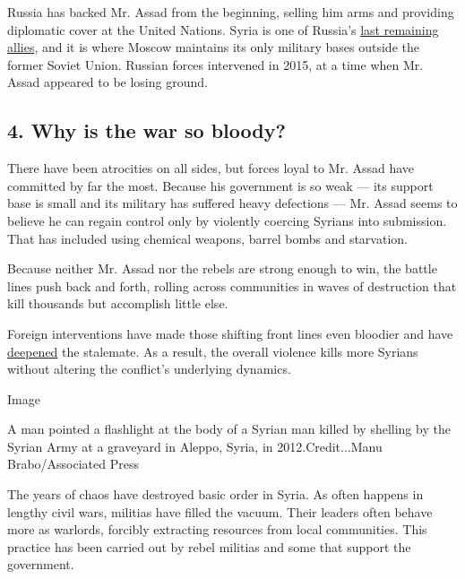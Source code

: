 Russia has backed Mr. Assad from the beginning, selling him arms and
providing diplomatic cover at the United Nations. Syria is one of
Russia's
\href{http://www.nytimes3xbfgragh.onion/2012/07/11/world/middleeast/russia-sends-warships-on-maneuvers-near-syria.html}{last
remaining allies}, and it is where Moscow maintains its only military
bases outside the former Soviet Union. Russian forces intervened in
2015, at a time when Mr. Assad appeared to be losing ground.

\hypertarget{4-why-is-the-war-so-bloody}{%
\subsection{\texorpdfstring{\textbf{4. Why is the war so
bloody?}}{4. Why is the war so bloody?}}\label{4-why-is-the-war-so-bloody}}

There have been atrocities on all sides, but forces loyal to Mr. Assad
have committed by far the most. Because his government is so weak ---
its support base is small and its military has suffered heavy defections
--- Mr. Assad seems to believe he can regain control only by violently
coercing Syrians into submission. That has included using chemical
weapons, barrel bombs and starvation.

Because neither Mr. Assad nor the rebels are strong enough to win, the
battle lines push back and forth, rolling across communities in waves of
destruction that kill thousands but accomplish little else.

Foreign interventions have made those shifting front lines even bloodier
and have
\href{http://www.nytimes3xbfgragh.onion/2016/08/27/world/middleeast/syria-civil-war-why-get-worse.html?hp\&action=click\&pgtype=Homepage\&clickSource=story-heading\&module=first-column-region\&region=top-news\&WT.nav=top-news\&_r=2}{deepened}
the stalemate. As a result, the overall violence kills more Syrians
without altering the conflict's underlying dynamics.

Image

A man pointed a flashlight at the body of a Syrian man killed by
shelling by the Syrian Army at a graveyard in Aleppo, Syria, in
2012.Credit...Manu Brabo/Associated Press

The years of chaos have destroyed basic order in Syria. As often happens
in lengthy civil wars, militias have filled the vacuum. Their leaders
often behave more as warlords, forcibly extracting resources from local
communities. This practice has been carried out by rebel militias and
some that support the government.

